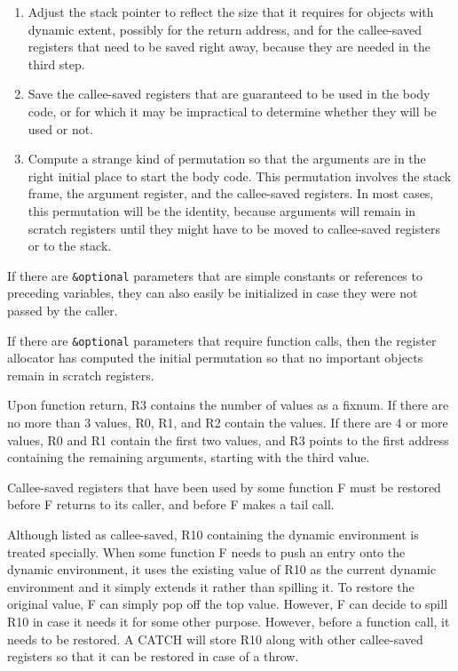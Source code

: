 \begin{enumerate}
\item Adjust the stack pointer to reflect the size that it requires
  for objects with dynamic extent, possibly for the return address,
  and for the callee-saved registers that need to be saved right
  away, because they are needed in the third step. 
\item Save the callee-saved registers that are guaranteed to be used
  in the body code, or for which it may be impractical to determine
  whether they will be used or not.  
\item Compute a strange kind of permutation so that the arguments are
  in the right initial place to start the body code.  This permutation
  involves the stack frame, the argument register, and the callee-saved
  registers.  In most cases, this permutation will be the identity,
  because arguments will remain in scratch registers until they might
  have to be moved to callee-saved registers or to the stack. 
\end{enumerate}

If there are \texttt{\&optional} parameters that are simple constants or
references to preceding variables, they can also easily be
initialized in case they were not passed by the caller. 

If there are \texttt{\&optional} parameters that require function calls, then
the register allocator has computed the initial permutation so that no
important objects remain in scratch registers.  

Upon function return, R3 contains the number of values as a fixnum.
If there are no more than 3 values, R0, R1, and R2 contain the
values. If there are 4 or more values, R0 and R1 contain the first two
values, and R3 points to the first address containing the remaining
arguments, starting with the third value.

Callee-saved registers that have been used by some function F must be
restored before F returns to its caller, and before F makes a tail
call.

Although listed as callee-saved, R10 containing the dynamic
environment is treated specially.  When some function F needs to push
an entry onto the dynamic environment, it uses the existing value of
R10 as the current dynamic environment and it simply extends it rather
than spilling it.  To restore the original value, F can simply pop off
the top value.  However, F can decide to spill R10 in case it needs it
for some other purpose.  However, before a function call, it needs to
be restored.  A CATCH will store R10 along with other callee-saved
registers so that it can be restored in case of a throw.

